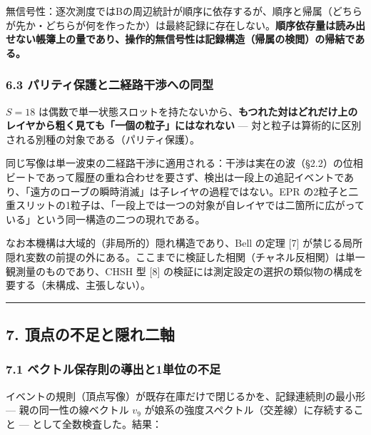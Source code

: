 \documentclass[
]{ltjsarticle}
\begin{document}
無信号性：逐次測度ではBの周辺統計が順序に依存するが、順序と帰属（どちらが先か・どちらが何を作ったか）は最終記録に存在しない。\textbf{順序依存量は読み出せない帳簿上の量であり、操作的無信号性は記録構造（帰属の検閲）の帰結である。}

\subsubsection{6.3
パリティ保護と二経路干渉への同型}\label{ux30d1ux30eaux30c6ux30a3ux4fddux8b77ux3068ux4e8cux7d4cux8defux5e72ux6e09ux3078ux306eux540cux578b}

\(S=18\)
は偶数で単一状態スロットを持たないから、\textbf{もつれた対はどれだけ上のレイヤから粗く見ても「一個の粒子」にはなれない}
--- 対と粒子は算術的に区別される別種の対象である（パリティ保護）。

同じ写像は単一波束の二経路干渉に適用される：干渉は実在の波（§2.2）の位相ビートであって履歴の重ね合わせを要さず、検出は一段上の追記イベントであり、「遠方のローブの瞬時消滅」は子レイヤの過程ではない。EPR
の2粒子と二重スリットの1粒子は、「一段上では一つの対象が自レイヤでは二箇所に広がっている」という同一構造の二つの現れである。

なお本機構は大域的（非局所的）隠れ構造であり、Bell の定理 {[}7{]}
が禁じる局所隠れ変数の前提の外にある。ここまでに検証した相関（チャネル反相関）は単一観測量のものであり、CHSH
型 {[}8{]}
の検証には測定設定の選択の類似物の構成を要する（未構成、主張しない）。

\begin{center}\rule{0.5\linewidth}{0.5pt}\end{center}

\subsection{7.
頂点の不足と隠れ二軸}\label{ux9802ux70b9ux306eux4e0dux8db3ux3068ux96a0ux308cux4e8cux8ef8}

\subsubsection{7.1
ベクトル保存則の導出と1単位の不足}\label{ux30d9ux30afux30c8ux30ebux4fddux5b58ux5247ux306eux5c0eux51faux30681ux5358ux4f4dux306eux4e0dux8db3}

イベントの規則（頂点写像）が既存在庫だけで閉じるかを、記録連続則の最小形
--- 親の同一性の線ベクトル \(v_9\)
が娘系の強度スペクトル（交差線）に存続すること ---
として全数検査した。結果：
\end{document}
